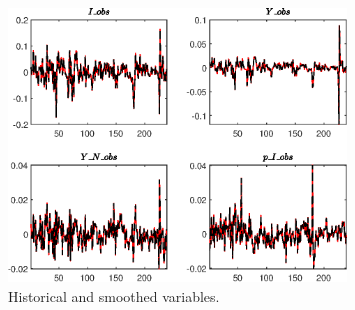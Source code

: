  
\begin{figure}[H]
\centering 
\includegraphics[width=0.80\textwidth]{BRS_growth_alt/graphs/BRS_growth_alt_HistoricalAndSmoothedVariables1}
\caption{Historical and smoothed variables.}\label{Fig:HistoricalAndSmoothedVariables:1}
\end{figure}


